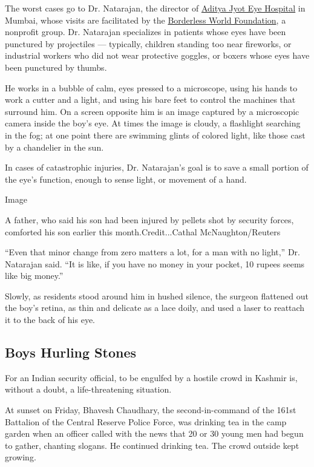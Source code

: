 The worst cases go to Dr. Natarajan, the director of
\href{http://adityajyoteyehospital.org/}{Aditya Jyot Eye Hospital} in
Mumbai, whose visits are facilitated by the
\href{http://borderlessworldfoundation.org/about-us/}{Borderless World
Foundation}, a nonprofit group. Dr. Natarajan specializes in patients
whose eyes have been punctured by projectiles --- typically, children
standing too near fireworks, or industrial workers who did not wear
protective goggles, or boxers whose eyes have been punctured by thumbs.

He works in a bubble of calm, eyes pressed to a microscope, using his
hands to work a cutter and a light, and using his bare feet to control
the machines that surround him. On a screen opposite him is an image
captured by a microscopic camera inside the boy's eye. At times the
image is cloudy, a flashlight searching in the fog; at one point there
are swimming glints of colored light, like those cast by a chandelier in
the sun.

In cases of catastrophic injuries, Dr. Natarajan's goal is to save a
small portion of the eye's function, enough to sense light, or movement
of a hand.

Image

A father, who said his son had been injured by pellets shot by security
forces, comforted his son earlier this month.Credit...Cathal
McNaughton/Reuters

``Even that minor change from zero matters a lot, for a man with no
light,'' Dr. Natarajan said. ``It is like, if you have no money in your
pocket, 10 rupees seems like big money.''

Slowly, as residents stood around him in hushed silence, the surgeon
flattened out the boy's retina, as thin and delicate as a lace doily,
and used a laser to reattach it to the back of his eye.

\hypertarget{boys-hurling-stones}{%
\subsection{Boys Hurling Stones}\label{boys-hurling-stones}}

For an Indian security official, to be engulfed by a hostile crowd in
Kashmir is, without a doubt, a life-threatening situation.

At sunset on Friday, Bhavesh Chaudhary, the second-in-command of the
161st Battalion of the Central Reserve Police Force, was drinking tea in
the camp garden when an officer called with the news that 20 or 30 young
men had begun to gather, chanting slogans. He continued drinking tea.
The crowd outside kept growing.


